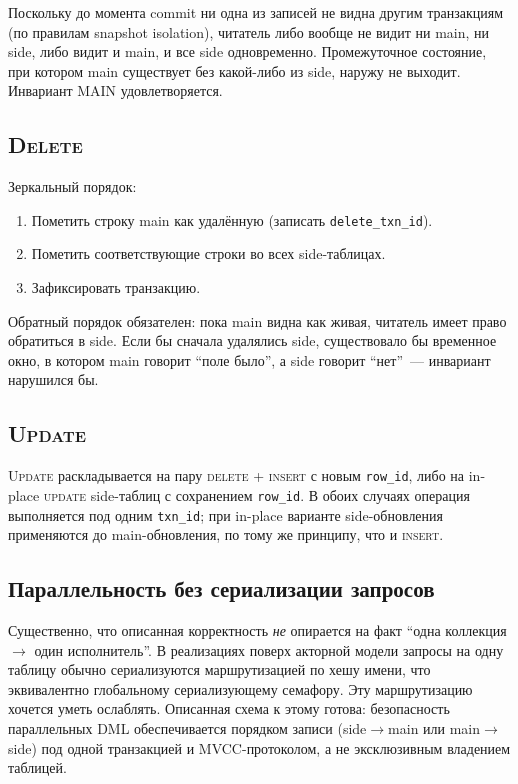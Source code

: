 \documentclass[conference,a4paper,10pt]{IEEEtran}
\begin{document}
Поскольку до момента commit ни одна из записей не видна другим
транзакциям (по правилам snapshot isolation), читатель либо вообще
не видит ни main, ни side, либо видит и main, и все side
одновременно. Промежуточное состояние, при котором main существует
без какой-либо из side, наружу не выходит. Инвариант MAIN
удовлетворяется.

\subsection{\textsc{Delete}}

Зеркальный порядок:

\begin{enumerate}
  \item Пометить строку main как удалённую (записать
        \texttt{delete\_txn\_id}).
  \item Пометить соответствующие строки во всех side-таблицах.
  \item Зафиксировать транзакцию.
\end{enumerate}

Обратный порядок обязателен: пока main видна как живая, читатель
имеет право обратиться в side. Если бы сначала удалялись side,
существовало бы временное окно, в котором main говорит ``поле
было'', а side говорит ``нет''~--- инвариант нарушился бы.

\subsection{\textsc{Update}}

\textsc{Update} раскладывается на пару \textsc{delete} +
\textsc{insert} с новым \texttt{row\_id}, либо на in-place
\textsc{update} side-таблиц с сохранением \texttt{row\_id}. В
обоих случаях операция выполняется под одним \texttt{txn\_id}; при
in-place варианте side-обновления применяются до main-обновления,
по тому же принципу, что и \textsc{insert}.

\subsection{Параллельность без сериализации запросов}

Существенно, что описанная корректность \emph{не} опирается на
факт ``одна коллекция $\to$ один исполнитель''. В реализациях
поверх акторной модели запросы на одну таблицу обычно сериализуются
маршрутизацией по хешу имени, что эквивалентно глобальному
сериализующему семафору. Эту маршрутизацию хочется уметь
ослаблять. Описанная схема к этому готова: безопасность
параллельных DML обеспечивается порядком записи (side$\to$main или
main$\to$side) под одной транзакцией и MVCC-протоколом, а не
эксклюзивным владением таблицей.
\end{document}

